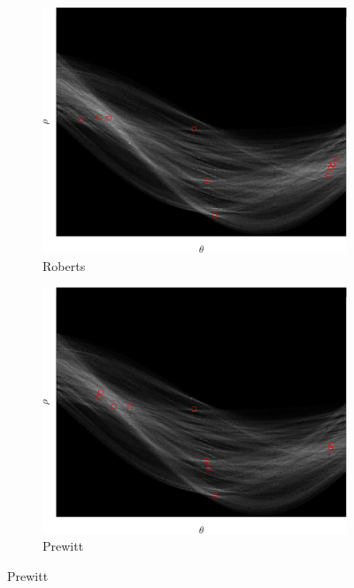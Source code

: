 \documentclass[lettersize,journal]{IEEEtran}
\begin{document}
\begin{figure}[h]
    \centering 
     
    \begin{subfigure}[h]{0.21\textwidth}
        \centering 
        \includegraphics[width=\linewidth]{hough_transform_roberts_0.03}
        \caption{Roberts}  
    \end{subfigure}
    \begin{subfigure}[h]{0.21\textwidth}
        \centering
        \includegraphics[width=\linewidth]{hough_transform_prewitt_0.025}
        \caption{Prewitt}  
    \end{subfigure}

\end{figure}
\end{document}
